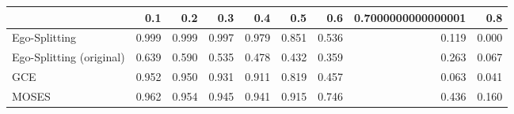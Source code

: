 \begin{tabular}{lrrrrrrrr}
\toprule
{} &   0.1 &   0.2 &   0.3 &   0.4 &   0.5 &   0.6 & 0.7000000000000001 &   0.8 \\
\midrule
Ego-Splitting            & 0.999 & 0.999 & 0.997 & 0.979 & 0.851 & 0.536 &              0.119 & 0.000 \\
Ego-Splitting (original) & 0.639 & 0.590 & 0.535 & 0.478 & 0.432 & 0.359 &              0.263 & 0.067 \\
GCE                      & 0.952 & 0.950 & 0.931 & 0.911 & 0.819 & 0.457 &              0.063 & 0.041 \\
MOSES                    & 0.962 & 0.954 & 0.945 & 0.941 & 0.915 & 0.746 &              0.436 & 0.160 \\
\bottomrule
\end{tabular}
